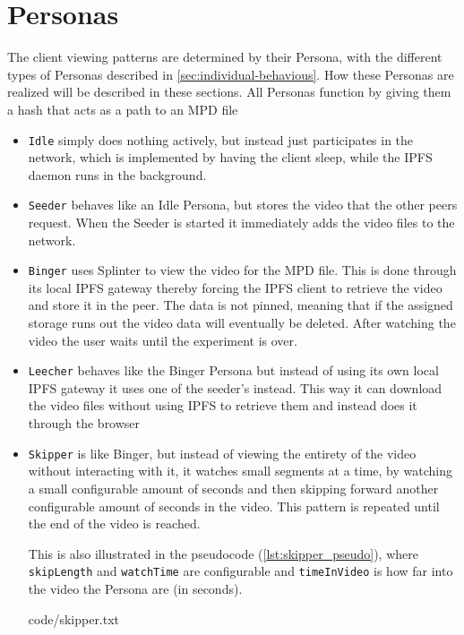 \section{Personas}
\label{sec:impl-personas}
The client viewing patterns are determined by their Persona, with the different types of Personas described in \autoref{sec:individual-behavious}. How these Personas are realized will be described in these sections.
All Personas function by giving them a hash that acts as a path to an \ac{MPD} file
\begin{itemize}
    \item \texttt{Idle} simply does nothing actively, but instead just participates in the network, which is implemented by having the client sleep, while the \ac{IPFS} daemon runs in the background.
    
    \item \texttt{Seeder} behaves like an Idle Persona, but stores the video that the other peers request. When the Seeder is started it immediately adds the video files to the network.
    
    \item \texttt{Binger} uses Splinter to view the video for the \ac{MPD} file. This is done through its local \ac{IPFS} gateway thereby forcing the \ac{IPFS} client to retrieve the video and store it in the peer. The data is not pinned, meaning that if the assigned storage runs out the video data will eventually be deleted. After watching the video the user waits until the experiment is over.
    
    \item \texttt{Leecher} behaves like the Binger Persona but instead of using its own local \ac{IPFS} gateway it uses one of the seeder's instead. This way it can download the video files without using \ac{IPFS} to retrieve them and instead does it through the browser
    
    \item \texttt{Skipper} is like Binger, but instead of viewing the entirety of the video without interacting with it, it watches small segments at a time, by watching a small configurable amount of seconds and then skipping forward another configurable amount of seconds  in the video. This pattern is repeated until the end of the video is reached. 
    
    This is also illustrated in the pseudocode (\autoref{lst:skipper_pseudo}), where \texttt{skipLength} and \texttt{watchTime} are configurable and \texttt{timeInVideo} is how far into the video the Persona are (in seconds).
    
    {code/skipper.txt}
    

\end{itemize}
